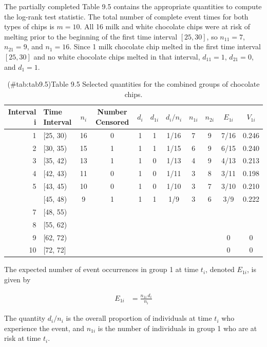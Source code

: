 \documentclass[
]{book}
\begin{document}
The partially completed Table 9.5 contains the appropriate quantities to compute the log-rank test statistic. The total number of complete event times for both types of chips is \(m = 10\). All 16 milk and white chocolate chips were at risk of melting prior to the beginning of the first time interval \([25,30]\), so \(n_{11} = 7\), \(n_{21} = 9\), and \(n_1 = 16\). Since 1 milk chocolate chip melted in the first time interval \([25,30]\) and no white chocolate chips melted in that interval, \(d_{11} = 1\), \(d_{21} = 0\), and \(d_1 = 1\).

\begin{table}[!h]
\centering
\caption{(\#tab:tab9.5)Table 9.5 Selected quantities for the combined groups of chocolate chips.}
\centering
\begin{tabular}[t]{rlccccccccc}
\toprule
Interval i & Time Interval & $n_i$ & Number Censored & $d_i$ & $d_{1i}$ & $d_i/n_i$ & $n_{1i}$ & $n_{2i}$ & $E_{1i}$ & $V_{1i}$\\
\midrule
1 & {}[25, 30) & 16 & 0 & 1 & 1 & 1/16 & 7 & 9 & 7/16 & 0.246\\
2 & {}[30, 35) & 15 & 1 & 1 & 1 & 1/15 & 6 & 9 & 6/15 & 0.240\\
3 & {}[35, 42) & 13 & 1 & 1 & 0 & 1/13 & 4 & 9 & 4/13 & 0.213\\
4 & {}[42, 43) & 11 & 0 & 1 & 0 & 1/11 & 3 & 8 & 3/11 & 0.198\\
5 & {}[43, 45) & 10 & 0 & 1 & 0 & 1/10 & 3 & 7 & 3/10 & 0.210\\
\addlinespace
6 & {}[45, 48) & 9 & 1 & 1 & 1 & 1/9 & 3 & 6 & 3/9 & 0.222\\
7 & {}[48, 55) &  &  &  &  &  &  &  &  & \\
8 & {}[55, 62) &  &  &  &  &  &  &  &  & \\
9 & {}[62, 72) &  &  &  &  &  &  &  & 0 & 0\\
10 & {}[72, 72] &  &  &  &  &  &  &  & 0 & 0\\
\bottomrule
\end{tabular}
\end{table}

The expected number of event occurrences in group 1 at time \(t_i\), denoted \(E_{1i}\), is given by

\begin{align}\label{9.10}
E_{1i} &= \frac{n_{1i}\,d_i}{n_i}
\tag{9.10}
\end{align}

The quantity \(d_i/n_i\) is the overall proportion of individuals at time \(t_i\) who experience the event, and \(n_{1i}\) is the
number of individuals in group 1 who are at risk at time \(t_i\).
\end{document}
